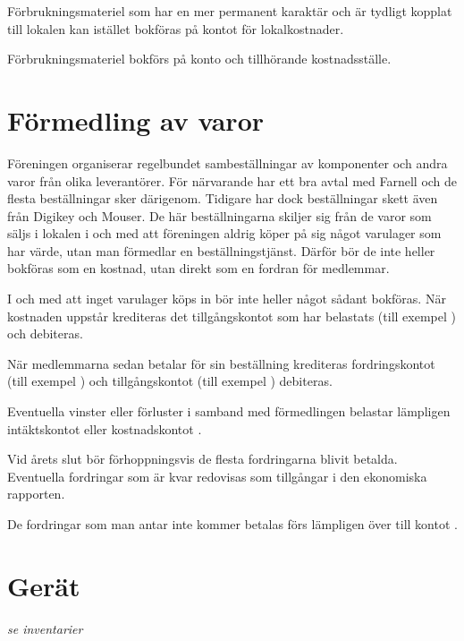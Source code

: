 		Förbrukningsmateriel som har en mer permanent karaktär och är tydligt kopplat till lokalen kan istället bokföras på kontot för lokalkostnader.
		
					\begin{redovisning}
						Förbrukningsmateriel bokförs på konto  och tillhörande kostnadsställe.
					\end{redovisning}
				
				\section{Förmedling av varor}
				
				Föreningen organiserar regelbundet sambeställningar av komponenter och andra varor från olika leverantörer. För närvarande har  ett bra avtal med Farnell och de flesta beställningar sker därigenom. Tidigare har dock beställningar skett även från Digikey och Mouser.
			De här beställningarna skiljer sig från de varor som säljs i lokalen i och med att föreningen aldrig köper på sig något varulager som har värde, utan man förmedlar en beställningstjänst. Därför bör de inte heller bokföras som en kostnad, utan direkt som en fordran för medlemmar.
					\begin{redovisning}
						I och med att inget varulager köps in bör inte heller något sådant bokföras. När kostnaden uppstår krediteras det tillgångskontot som har belastats (till exempel ) och \kref{1510} debiteras.
		
			När medlemmarna sedan betalar för sin beställning krediteras fordringskontot (till exempel ) och tillgångskontot (till exempel ) debiteras.
		
			Eventuella vinster eller förluster i samband med förmedlingen belastar lämpligen intäktskontot  eller kostnadskontot \kref{6000}.
					\end{redovisning}
				
					\begin{bokslut}
						Vid årets slut bör förhoppningsvis de flesta fordringarna blivit betalda. Eventuella fordringar som är kvar redovisas som tillgångar i den ekonomiska rapporten.
		
			De fordringar som man antar inte kommer betalas förs lämpligen över till kontot .
					\end{bokslut}
				
				\section{Gerät}
				\emph{se inventarier}
			
